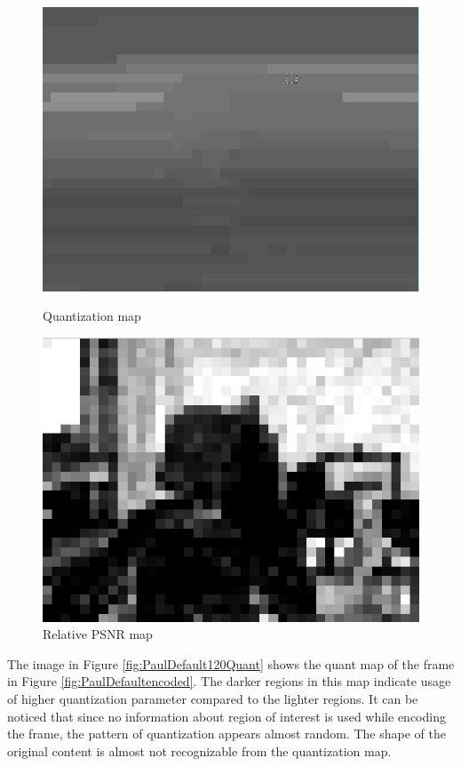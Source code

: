 \documentclass[11pt]{article} %
\begin{document}
\begin{figure}[!h]
    \centering
    \includegraphics[scale=0.5]{PaulDefault120_91250kbps_quant}
    \caption{Quantization map}
    \label{fig:PaulDefault120Quant}
    \includegraphics[scale=0.5]{PaulDefault120_91250kbps_psnr}
    \caption{Relative PSNR map}
    \label{fig:PaulDefault120PSNR}
\end{figure} 

The image in Figure \ref{fig:PaulDefault120Quant} shows the quant map of the frame in Figure \ref{fig:PaulDefaultencoded}. The darker regions in this map indicate usage of higher quantization parameter compared to the lighter regions. It can be noticed that since no information about region of interest is used while encoding the frame, the pattern of quantization appears almost random. The shape of the original content is almost not recognizable from the quantization map.
\end{document}
